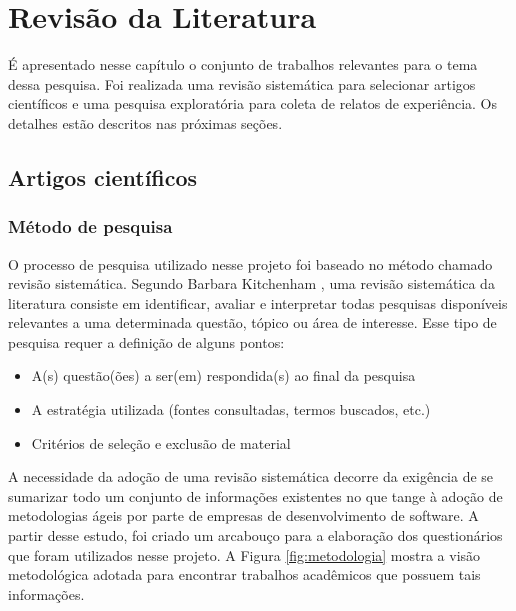 \chapter{Revisão da Literatura}

É apresentado nesse capítulo o conjunto de trabalhos relevantes para o tema dessa pesquisa. Foi realizada uma revisão sistemática para selecionar artigos científicos e uma pesquisa exploratória para coleta de relatos de experiência. Os detalhes estão descritos nas próximas seções.

\section{Artigos científicos}

\subsection{Método de pesquisa}

O processo de pesquisa utilizado nesse projeto foi baseado no método chamado revisão sistemática. Segundo Barbara Kitchenham \cite{Barbara04}, uma revisão sistemática da literatura consiste em identificar, avaliar e interpretar todas pesquisas disponíveis relevantes a uma determinada questão, tópico ou área de interesse. Esse tipo de pesquisa requer a definição de alguns pontos:

\begin{itemize}
	\item A(s) questão(ões) a ser(em) respondida(s) ao final da pesquisa
	\item A estratégia utilizada (fontes consultadas, termos buscados, etc.)
	\item Critérios de seleção e exclusão de material
\end{itemize}

A necessidade da adoção de uma revisão sistemática decorre da exigência de se sumarizar todo um conjunto de informações existentes no que tange à adoção de metodologias ágeis por parte de empresas de desenvolvimento de software. A partir desse estudo, foi criado um arcabouço para a elaboração dos questionários que foram utilizados nesse projeto. A Figura \ref{fig:metodologia} mostra a visão metodológica adotada para encontrar trabalhos acadêmicos que possuem tais informações.


